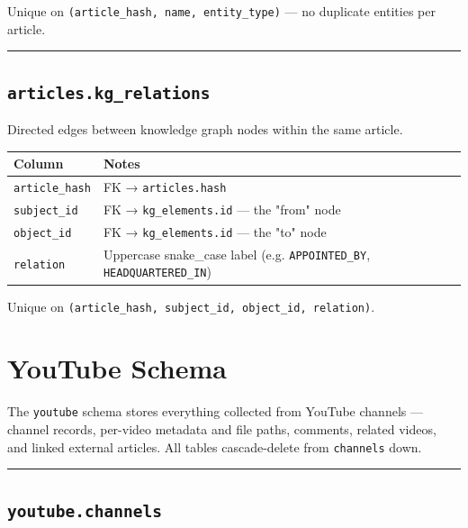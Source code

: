 \documentclass[
]{article}
\newcounter{none} %
\begin{document}
Unique on \texttt{(article\_hash,\ name,\ entity\_type)} --- no
duplicate entities per article.

\begin{center}\rule{0.5\linewidth}{0.5pt}\end{center}

\subsection{\texorpdfstring{\texttt{articles.kg\_relations}}{articles.kg\_relations}}\label{articleskg_relations}

Directed edges between knowledge graph nodes within the same article.

{\def\LTcaptype{none} %
\begin{longtable}[]{@{}ll@{}}
\toprule\noalign{}
Column & Notes \\
\midrule\noalign{}
\endhead
\bottomrule\noalign{}
\endlastfoot
\texttt{article\_hash} & FK → \texttt{articles.hash} \\
\texttt{subject\_id} & FK → \texttt{kg\_elements.id} --- the "from"
node \\
\texttt{object\_id} & FK → \texttt{kg\_elements.id} --- the "to" node \\
\texttt{relation} & Uppercase snake\_case label (e.g.
\texttt{APPOINTED\_BY}, \texttt{HEADQUARTERED\_IN}) \\
\end{longtable}
}

Unique on
\texttt{(article\_hash,\ subject\_id,\ object\_id,\ relation)}.

\label{file-youtube-schema}
\section{YouTube Schema}\label{youtube-schema}

The \texttt{youtube} schema stores everything collected from YouTube
channels --- channel records, per-video metadata and file paths,
comments, related videos, and linked external articles. All tables
cascade-delete from \texttt{channels} down.

\begin{center}\rule{0.5\linewidth}{0.5pt}\end{center}

\subsection{\texorpdfstring{\texttt{youtube.channels}}{youtube.channels}}\label{youtubechannels}
\end{document}

